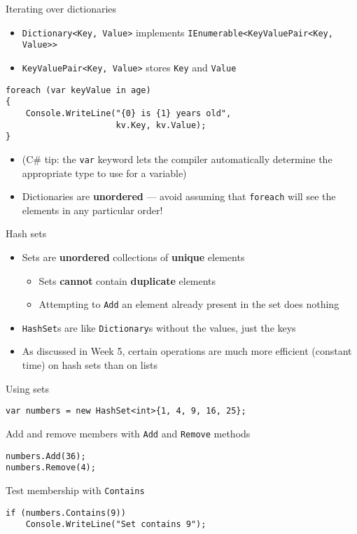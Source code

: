 \begin{frame}[fragile]{Iterating over dictionaries}
	\begin{itemize}
		\pause\item \lstinline{Dictionary<Key, Value>} implements \lstinline{IEnumerable<KeyValuePair<Key, Value>>}
		\pause\item \lstinline{KeyValuePair<Key, Value>} stores \lstinline{Key} and \lstinline{Value}
	\end{itemize}		
	\pause
	\begin{lstlisting}
foreach (var keyValue in age)
{
	Console.WriteLine("{0} is {1} years old",
					  kv.Key, kv.Value);
}
	\end{lstlisting}
	\begin{itemize}
	    \pause\item (C\# tip: the \lstinline{var} keyword lets the compiler automatically determine the appropriate type to use for a variable)
		\pause\item Dictionaries are \textbf{unordered} --- avoid assuming that \lstinline{foreach}
		    will see the elements in any particular order!
	\end{itemize}		
\end{frame}

\begin{frame}{Hash sets}
	\begin{itemize}
		\pause\item Sets are \textbf{unordered} collections of \textbf{unique} elements
            \begin{itemize}
                \pause\item Sets \textbf{cannot} contain \textbf{duplicate} elements
                \pause\item Attempting to \lstinline{Add} an element already present in the set does nothing
            \end{itemize}
		\pause\item \lstinline{HashSet}s are like \lstinline{Dictionary}s without the values, just the keys
		\pause\item As discussed in Week 5, certain operations are much more efficient (constant time) on hash sets than on lists
	\end{itemize}
\end{frame}

\begin{frame}[fragile]{Using sets}
	\begin{lstlisting}
var numbers = new HashSet<int>{1, 4, 9, 16, 25};
	\end{lstlisting}
	\pause Add and remove members with \lstinline{Add} and \lstinline{Remove} methods
	\begin{lstlisting}
numbers.Add(36);
numbers.Remove(4);
	\end{lstlisting}
	\pause Test membership with \lstinline{Contains}
	\begin{lstlisting}
if (numbers.Contains(9))
    Console.WriteLine("Set contains 9");
	\end{lstlisting}
\end{frame}
